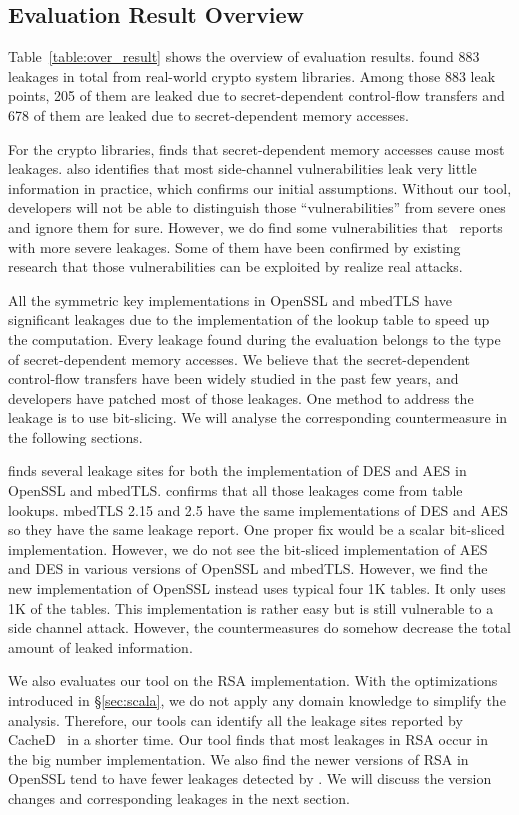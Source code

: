 \subsection{Evaluation Result Overview} \label{sec:eval_overview}
Table~\ref{table:over_result} shows the overview of evaluation results. \tool{} found
883 leakages in total from real-world crypto system libraries. Among those 883
leak points, 205 of them are leaked due to secret-dependent control-flow
transfers and 678 of them are leaked due to secret-dependent memory accesses.

For the crypto libraries, \tool{} finds that secret-dependent memory accesses
cause most leakages. \tool{} also identifies that most side-channel
vulnerabilities leak very little information in practice, which confirms our
initial assumptions.  Without our tool, developers will not be able to
distinguish those ``vulnerabilities'' from severe ones and ignore them for sure.
However, we do find some vulnerabilities that \tool\ reports with more severe
leakages. Some of them have been confirmed by existing research that those
vulnerabilities can be exploited by realize real attacks.

All the symmetric key implementations in OpenSSL and mbedTLS have significant
leakages due to the implementation of the lookup table to speed up the
computation. Every leakage found during the evaluation belongs to the type of
secret-dependent memory accesses. We believe that the secret-dependent
control-flow transfers have been widely studied in the past few years, and
developers have patched most of those leakages. One method to address the
leakage is to use bit-slicing. We will analyse the corresponding countermeasure
in the following sections.

\tool{} finds several leakage sites for both the implementation of DES and AES in
OpenSSL and mbedTLS\@. \tool{} confirms that all those leakages come from table
lookups. mbedTLS 2.15 and 2.5 have the same implementations of DES and AES so
they have the same leakage report. One proper fix would be a scalar bit-sliced
implementation. However, we do not see the bit-sliced implementation of AES and
DES in various versions of OpenSSL and mbedTLS\@. However, we find the new
implementation of OpenSSL instead uses typical four 1K tables. It only uses 1K
of the tables. This implementation is rather easy but is still vulnerable to a
side channel attack. However, the countermeasures do somehow decrease the total
amount of leaked information.

We also evaluates our tool on the RSA implementation. With the optimizations
introduced in \S\ref{sec:scala}, we do not apply any domain knowledge to
simplify the analysis. Therefore, our tools can identify all the leakage sites
reported by CacheD~\cite{203878} in a shorter time. Our tool finds that most
leakages in RSA occur in the big number implementation. We also find the newer
versions of RSA in OpenSSL tend to have fewer leakages detected by \tool{}. We
will discuss the version changes and corresponding leakages in the next section.

